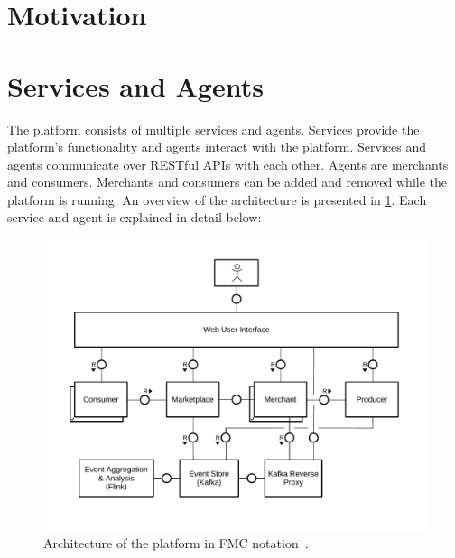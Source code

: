\section{Motivation}
\todo{}

\section{Services and Agents}
The \pricewars platform consists of multiple services and agents.
Services provide the platform's functionality and agents interact with the platform.
Services and agents communicate over RESTful APIs with each other.
Agents are merchants and consumers.
Merchants and consumers can be added and removed while the platform is running.
An overview of the architecture is presented in \cref{fig:platform_architecture}.
Each service and agent is explained in detail below:

\begin{figure}[t]
	\centering
	\includegraphics[width=\textwidth]{figures/pricewars-architecture}
	\caption[\pricewars Architecture]
	{Architecture of the \pricewars platform in FMC notation~\cite{knopfel2005fundamental}.}
	\label{fig:platform_architecture}
\end{figure}

